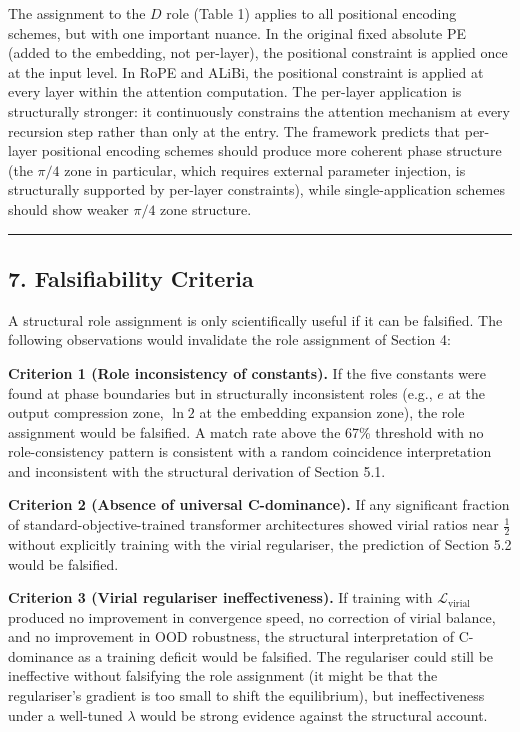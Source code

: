 \documentclass[
  11pt,
  letterpaper,
]{article}
\begin{document}
The assignment to the \(D\) role (Table 1) applies to all positional
encoding schemes, but with one important nuance. In the original fixed
absolute PE (added to the embedding, not per-layer), the positional
constraint is applied once at the input level. In RoPE and ALiBi, the
positional constraint is applied at every layer within the attention
computation. The per-layer application is structurally stronger: it
continuously constrains the attention mechanism at every recursion step
rather than only at the entry. The framework predicts that per-layer
positional encoding schemes should produce more coherent phase structure
(the \(\pi/4\) zone in particular, which requires external parameter
injection, is structurally supported by per-layer constraints), while
single-application schemes should show weaker \(\pi/4\) zone structure.

\begin{center}\rule{0.5\linewidth}{0.5pt}\end{center}

\subsection{7. Falsifiability Criteria}\label{falsifiability-criteria}

A structural role assignment is only scientifically useful if it can be
falsified. The following observations would invalidate the role
assignment of Section 4:

\textbf{Criterion 1 (Role inconsistency of constants).} If the five
constants were found at phase boundaries but in structurally
inconsistent roles (e.g., \(e\) at the output compression zone,
\(\ln 2\) at the embedding expansion zone), the role assignment would be
falsified. A match rate above the 67\% threshold with no
role-consistency pattern is consistent with a random coincidence
interpretation and inconsistent with the structural derivation of
Section 5.1.

\textbf{Criterion 2 (Absence of universal C-dominance).} If any
significant fraction of standard-objective-trained transformer
architectures showed virial ratios near \(\frac{1}{2}\) without
explicitly training with the virial regulariser, the prediction of
Section 5.2 would be falsified.

\textbf{Criterion 3 (Virial regulariser ineffectiveness).} If training
with \(\mathcal{L}_\text{virial}\) produced no improvement in
convergence speed, no correction of virial balance, and no improvement
in OOD robustness, the structural interpretation of C-dominance as a
training deficit would be falsified. The regulariser could still be
ineffective without falsifying the role assignment (it might be that the
regulariser's gradient is too small to shift the equilibrium), but
ineffectiveness under a well-tuned \(\lambda\) would be strong evidence
against the structural account.
\end{document}
